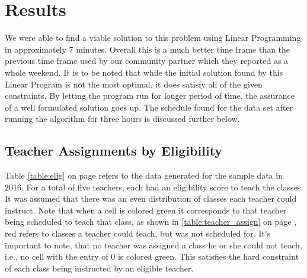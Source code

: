 \documentclass[11pt]{article}
\begin{document}
\section{Results}
We were able to find a viable solution to this problem using Linear Programming in approximately 7 minutes. Overall this is a much better time frame than the previous time frame used by our community partner which they reported as a whole weekend. It is to be noted that while the initial solution found by this Linear Program is not the most optimal, it does satisfy all of the given constraints. By letting the program run for longer period of time, the assurance of a well formulated solution goes up. The schedule found for the data set after running the algorithm for three hours is discussed further below.\\

	\subsection{Teacher Assignments by Eligibility}
Table \ref{table:elig} on page \pageref{table:elig} refers to the data generated for the sample data in 2016. For a total of five teachers, each had an eligibility score to teach the classes. It was assumed that there was an even distribution of classes each teacher could instruct. Note that when a cell is colored green it corresponds to that teacher being scheduled to teach that class, as shown in \ref{table:teacher_assign} on page \pageref{table:teacher_assign}, red refers to classes a teacher could teach, but was not scheduled for. It's important to note, that no teacher was assigned a class he or she could not teach, i.e., no cell with the entry of 0 is colored green. This satisfies the hard constraint of each class being instructed by an eligible teacher. 
\end{document}
